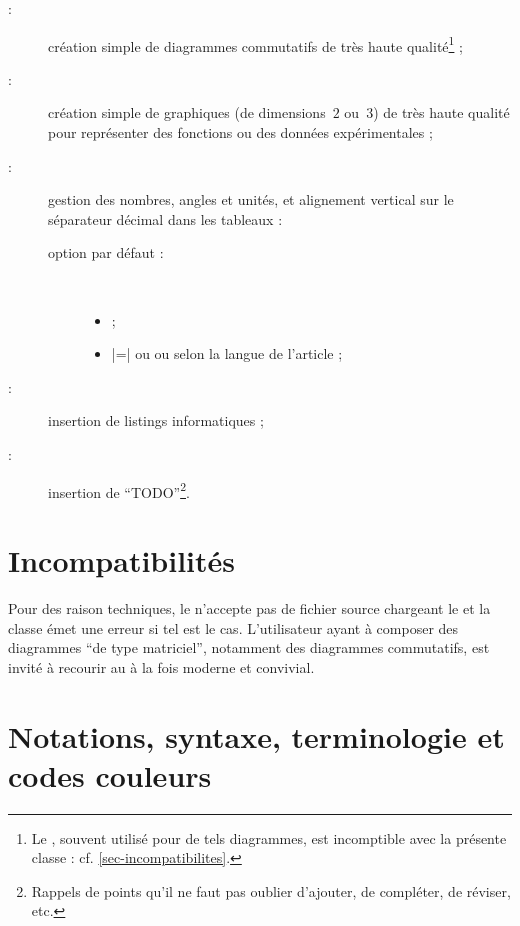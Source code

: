 \documentclass[english,nolocaltoc]{nwejmart}
\newtheorem[style=definition]{fait}
\newtheorem[title=expérience]{experience}
\newtheorem[title-plural=anneaux]{anneau}
\newtheorem[title=idéal,title-plural=idéaux]{ideal}
\begin{document}
\begin{description}
\item[ :] création simple de diagrammes commutatifs de très
  haute qualité\footnote{Le , souvent utilisé pour de tels
    diagrammes, est incomptible avec la présente classe :
    cf. \vref{sec-incompatibilites}.} ;
\item[ :] création simple de graphiques (de dimensions~$2$
  ou~$3$) de très haute qualité pour représenter des fonctions ou des données
  expérimentales ;
\item[ :] gestion des nombres, angles et unités, et alignement
  vertical sur le séparateur décimal dans les tableaux :
  \begin{description}
  \item[option par défaut :]\
    \begin{itemize}
    \item {} ;
    \item {}|=| ou  ou 
      selon la langue de l'article ;
    \end{itemize}
  \end{description}
\item[ :] insertion de listings informatiques ;
\item[\package{todonotes} :] insertion de \enquote{TODO}\footnote{Rappels de
    points qu'il ne faut pas oublier d'ajouter, de compléter, de réviser, etc.}.
\end{description}

\section{Incompatibilités}
\label{sec-incompatibilites}

Pour des raison techniques, le \nwejm{} n'accepte pas de fichier source
\file{.tex} chargeant le \Package{xy} et la classe \nwejmauthor{} émet une
erreur si tel est le cas. L'utilisateur ayant à composer des diagrammes
\enquote{de type matriciel}, notamment des diagrammes commutatifs, est invité
à recourir au \Package{tikz-cd} à la fois moderne et convivial.

\section{Notations, syntaxe, terminologie et codes couleurs}\label{sec-synt-term-notat}
\end{document}

